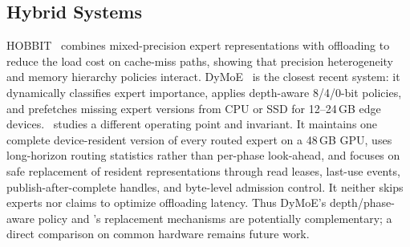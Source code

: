 \subsection{Hybrid Systems}
HOBBIT~\cite{tang2024hobbit} combines mixed-precision expert representations with offloading to reduce the load cost on cache-miss paths, showing that precision heterogeneity and memory hierarchy policies interact. DyMoE~\cite{huang2026dymoe} is the closest recent system: it dynamically classifies expert importance, applies depth-aware 8/4/0-bit policies, and prefetches missing expert versions from CPU or SSD for 12--24\,GB edge devices. \systemname\ studies a different operating point and invariant. It maintains one complete device-resident version of every routed expert on a 48\,GB GPU, uses long-horizon routing statistics rather than per-phase look-ahead, and focuses on safe replacement of resident representations through read leases, last-use events, publish-after-complete handles, and byte-level admission control. It neither skips experts nor claims to optimize offloading latency. Thus DyMoE's depth/phase-aware policy and \systemname's replacement mechanisms are potentially complementary; a direct comparison on common hardware remains future work.
